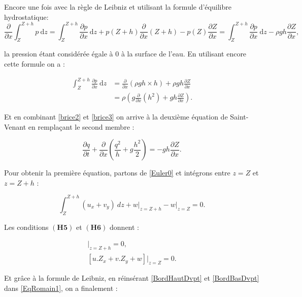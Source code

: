 \documentclass[
11pt, %
francais, %
singlespacing, %
headsepline, %
f%
]{MastersDoctoralThesis} %
\theoremstyle{definition}
\begin{document}
Encore une fois avec la règle de Leibniz et utilisant la formule d'équilibre hydrostatique:
$$ \frac{\partial }{\partial x}\int_{Z}^{Z+h}p ~\mathrm dz =\int_{Z}^{Z+h}\frac{\partial p}{\partial x}~\mathrm dz + p(Z+h)\frac{\partial}{\partial x}(Z+h)-p(Z)\frac{\partial Z}{\partial x} = \int_{Z}^{Z+h}\frac{\partial p}{\partial x} ~\mathrm dz-\rho g h\frac{\partial Z}{\partial x},$$ 

la pression étant considérée égale à $0$ à la surface de l'eau. En utilisant encore cette formule on a :

\begin{equation}
\begin{split}
\int_{Z}^{Z+h}\frac{\partial p}{\partial x} ~\mathrm dz&=\frac{\partial}{\partial x} (\rho gh\times h) + \rho gh\frac{\partial Z}{\partial x}\\ \label{brice3}
&=\rho(g\frac{\partial}{\partial x}(h^{2})+gh\frac{\partial Z}{\partial x}).
\end{split}
\end{equation}

Et en combinant \ref{brice2} et \ref{brice3} on arrive à la deuxième équation de Saint-Venant en rempla\c cant le second membre :

\begin{equation}
\frac{\partial q}{\partial t}+\frac{\partial}{\partial x}(\frac{q^{2}}{h}+g\frac{h^{2}}{2})=-g h\frac{\partial Z}{\partial x}. \label{EqSaintVenant2}
\end{equation}


Pour obtenir la première équation, partons de \ref{Euler0} et intégrons entre $z=Z$ et $z=Z+h$ :

\begin{equation}
\int_{Z}^{Z+h} (u_x + v_y) \ dz + w\vert_{z=Z+h}-w\vert_{z=Z} = 0.
\label{EqRomain1}
\end{equation}

Les conditions $(\textbf{H5})$ et  $(\textbf{H6})$ donnent :

\begin{align}
[ \frac{\partial (Z+h)}{\partial t} + u.\frac{\partial (Z+h)}{\partial x} + v.\frac{\partial (Z+h)}{\partial y} - w ] \vert _{z=Z+h} = 0 \label{BordHautDvpt}, \\
[ u.Z_x + v.Z_y + w ] \vert _{z=Z} = 0. \label{BordBasDvpt}
\end{align}

Et grâce à la formule de Leibniz, en réinsérant \ref{BordHautDvpt} et \ref{BordBasDvpt} dans \ref{EqRomain1}, on a finalement : 
\end{document}
